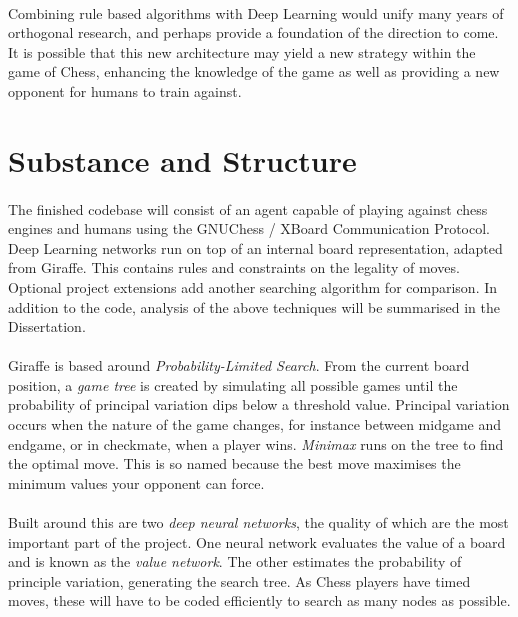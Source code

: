 \documentclass[a4paper]{article}
\begin{document}
\paragraph{}Combining rule based algorithms with Deep Learning would unify many years of orthogonal research, and perhaps provide a foundation of the direction to come. It is possible that this new architecture may yield a new strategy within the game of Chess, enhancing the knowledge of the game as well as providing a new opponent for humans to train against.

\section*{Substance and Structure}

\paragraph{}The finished codebase will consist of an agent capable of playing against chess engines and humans using the GNUChess / XBoard Communication Protocol. Deep Learning networks run on top of an internal board representation, adapted from Giraffe. This contains rules and constraints on the legality of moves. Optional project extensions add another searching algorithm for comparison. In addition to the code, analysis of the above techniques will be summarised in the Dissertation.

\paragraph{}Giraffe is based around \textit{Probability-Limited Search}. From the current board position, a \textit{game tree} is created by simulating all possible games until the probability of principal variation dips below a threshold value. Principal variation occurs when the nature of the game changes, for instance between midgame and endgame, or in checkmate, when a player wins. \textit{Minimax} runs on the tree to find the optimal move. This is so named because the best move maximises the minimum values your opponent can force.

\paragraph{}Built around this are two \textit{deep neural networks}, the quality of which are the most important part of the project. One neural network evaluates the value of a board and is known as the \textit{value network}. The other estimates the probability of principle variation, generating the search tree. As Chess players have timed moves, these will have to be coded efficiently to search as many nodes as possible.
\end{document}

